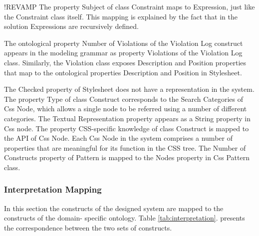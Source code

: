 \documentclass[parskip=full]{uvamscse}
\begin{document}
!REVAMP
The property Subject of class Constraint maps to Expression, just like the Constraint class itself.
This mapping is explained by the fact that in the solution Expressions are recursively defined.

The ontological property Number of Violations of the Violation Log construct appears in the modeling
grammar as property Violations of the Violation Log class. Similarly, the Violation class exposes
Description and Position properties that map to the ontological properties Description and Position in Stylesheet.

The Checked property of Stylesheet does not have a representation in the system. The property Type
of class Construct corresponds to the Search Categories of Css Node, which allows a single node to
be referred using a number of different categories. The Textual Representation property appears as a
String property in Css node. The property CSS-specific knowledge of class Construct is mapped to the
API of Css Node. Each Css Node in the system comprises a number of properties that are meaningful
for its function in the CSS tree. The Number of Constructs property of Pattern is mapped to the
Nodes property in Css Pattern class.


\subsubsection{Interpretation Mapping}

In this section the constructs of the designed system are mapped to the constructs of the domain-
specific ontology. Table \ref{tab:interpretation}. presents the correspondence between the two sets
of constructs.
\end{document}
